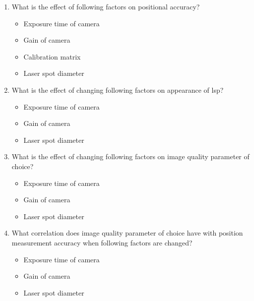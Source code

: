 \begin{enumerate}
    \item What is the effect of following factors on positional accuracy?
        \begin{itemize}
            \item Exposure time of camera
            \item Gain of camera
            \item Calibration matrix
            \item Laser spot diameter
        \end{itemize}
    \item What is the effect of changing following factors on appearance of \gls{lsp}?
        \begin{itemize}
            \item Exposure time of camera
            \item Gain of camera
            \item Laser spot diameter
        \end{itemize}
    \item What is the effect of changing following factors on image quality parameter of choice?
        \begin{itemize}
            \item Exposure time of camera
            \item Gain of camera
            \item Laser spot diameter
        \end{itemize}
    \item What correlation does image quality parameter of choice have with position measurement accuracy when following factors are changed?
        \begin{itemize}
            \item Exposure time of camera
            \item Gain of camera
            \item Laser spot diameter
        \end{itemize} 
\end{enumerate}

